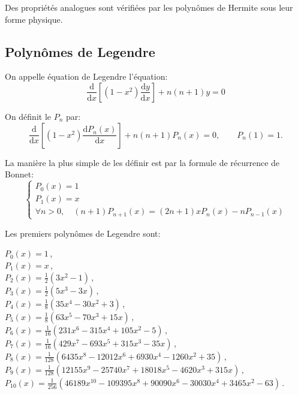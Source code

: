 Des propriétés analogues sont vérifiées par les polynômes de Hermite 
sous leur forme physique.





\medskip
\subsection{Polynômes de Legendre}

On appelle équation de Legendre l'équation:
\begin{equation}\frac{\textrm{d}}{\textrm{d}x}[(1-x^{2})\frac{\textrm{d}y}{\textrm{d}x}]+n(n+1)y=0\end{equation}

On définit le  $P_n$ par:
\begin{equation}
\frac{\textrm{d}}{\textrm{d}x}[(1-x^{2})\frac{\textrm{d}P_n(x)}{\textrm{d}x}]+n(n+1)P_n(x)=0,\qquad P_n(1)=1.
\end{equation}

\medskip
La manière la plus simple de les définir est par la formule de récurrence de Bonnet:
\begin{equation}\left\{
\begin{array}{l}
P_0(x)=1\\
P_1(x)=x\\
\forall n>0, \quad

    (n+1)P_{n+1}(x)=(2n+1)xP_n(x) - nP_{n-1}(x)
\end{array} 
\right.
\end{equation}

\medskip
{}
Les premiers polynômes de Legendre sont:

\noindent
    $P_{0}(x)=1\,$,\\
    $P_{1}(x)=x\,$,\\
    $P_{2}(x)=\frac{1}{2}(3x^{2}-1)\,$,\\
    $P_{3}(x)=\frac{1}{2}(5x^{3}-3x)\,$,\\
    $P_{4}(x)=\frac{1}{8}(35x^{4}-30x^{2}+3)\,$,\\
    $P_{5}(x)=\frac{1}{8}(63x^{5}-70x^{3}+15x)\,$,\\
    $P_{6}(x)=\frac{1}{16}(231x^{6}-315x^{4}+105x^{2}-5)\,$,\\
    $P_{7}(x)=\frac{1}{16}(429x^{7}-693x^{5}+315x^{3}-35x)\,$,\\
    $P_{8}(x)=\frac{1}{128}(6435x^{8}-12012x^{6}+6930x^{4}-1260x^{2}+35)\,$,\\
    $P_{9}(x)=\frac{1}{128}(12155x^{9}-25740x^{7}+18018x^{5}-4620x^{3}+315x)\,$,\\
    $P_{10}(x)=\frac{1}{256}(46189x^{10}-109395x^{8}+90090x^{6}-30030x^{4}+3465x^{2}-63)\,$.

